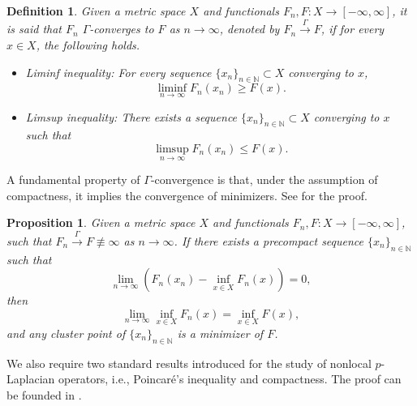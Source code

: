 \documentclass{article}
\newtheorem{definition}[theorem]{Definition}
\newtheorem{proposition}[theorem]{Proposition}
\theoremstyle{definition}
\begin{document}
\begin{definition}
Given a metric space $X$ and functionals $F_n, F: X\rightarrow [-\infty,\infty]$, it is said that $F_n$ $\Gamma$-converges to $F$ as $n\rightarrow\infty$, denoted by $F_n\stackrel{\Gamma}{\longrightarrow }F$,
if for every $x\in X$, the following holds.
\begin{itemize}
  \item Liminf inequality: For every sequence $\{x_n\}_{n\in\mathbb{N}}\subset X$ converging to $x$,
      \begin{equation*}
        \liminf_{n\rightarrow\infty} F_n(x_n)\geq F(x).
      \end{equation*}
  \item Limsup inequality: There exists a sequence $\{x_n\}_{n\in\mathbb{N}}\subset X$ converging to $x$ such that
      \begin{equation*}
        \limsup_{n\rightarrow\infty} F_n(x_n)\leq F(x).
      \end{equation*}
\end{itemize}
\end{definition}


A fundamental property of $\Gamma$-convergence is that, under the assumption of compactness, it implies the convergence of minimizers. See \cite[Theorem 1.21]{braides2002gamma} for the proof.


\begin{proposition}\label{pr:2.2}
  Given a metric space $X$ and functionals $F_n, F: X\rightarrow [-\infty,\infty]$, such that
  $F_n\stackrel{\Gamma}{\longrightarrow }F\not\equiv\infty$ as $n\rightarrow\infty$.
  If there exists a precompact sequence $\{x_n\}_{n\in\mathbb{N}}$ such that
  \begin{equation*}
    \lim_{n\rightarrow\infty}\left(F_n(x_n)-\inf_{x\in X}F_n(x)\right)=0,
  \end{equation*}
  then
  \begin{equation*}
    \lim_{n\rightarrow\infty}\inf_{x\in X}F_n(x)=\inf_{x\in X}F(x),
  \end{equation*}
  and any cluster point of $\{x_n\}_{n\in\mathbb{N}}$ is a minimizer of $F$.
\end{proposition}

We also require two standard results introduced for the study of nonlocal $p$-Laplacian operators, i.e., Poincar\'{e}'s inequality and compactness.
The proof can be founded in \cite[Proposition 4.1, Proposition 3.2]{andreu2008nonlocal}.
\end{document}

